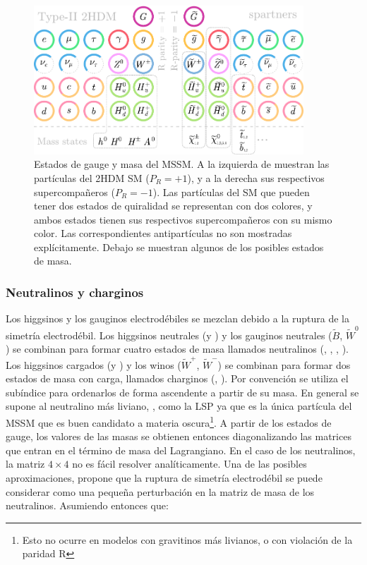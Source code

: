 \begin{figure}
  \centering
  \includegraphics[width=0.9\textwidth]{images/theory/sm_susy_v2.pdf}
  \caption{Estados de gauge y masa del MSSM. A la izquierda de muestran las partículas del 2HDM SM ($P_R = +1$), y a la derecha sus respectivos supercompañeros ($P_R = -1$). Las partículas del SM que pueden tener dos estados de quiralidad se representan con dos colores, y ambos estados tienen sus respectivos supercompañeros con su mismo color. Las correspondientes antipartículas no son mostradas explícitamente. Debajo se muestran algunos de los posibles estados de masa. 
  }
  \label{fig:susy_part}
\end{figure}

\subsubsection{Neutralinos y charginos}

Los higgsinos y los gauginos electrodébiles se mezclan debido a la ruptura de la simetría electrodébil. Los higgsinos neutrales (\Hinouzero y \Hinodzero) y los gauginos neutrales ($\widetilde{B}$, $\widetilde{W}^0$) se combinan para formar cuatro estados de masa llamados neutralinos (\ninoone, \ninotwo, \ninothree, \ninofour). Los higgsinos cargados (\Hinoup y \Hinodm) y los winos ($\widetilde{W}^+$, $\widetilde{W}^-$) se combinan para formar dos estados de masa con carga, llamados charginos (\chinoonepm, \chinotwopm). Por convención se utiliza el subíndice para ordenarlos de forma ascendente a partir de su masa. En general se supone al neutralino más liviano, \ninoone, como la LSP ya que es la única partícula del MSSM que es buen candidato a materia oscura\footnote{Esto no ocurre en modelos con gravitinos más livianos, o con violación de la paridad R}. A partir de los estados de gauge, los valores de las masas se obtienen entonces diagonalizando las matrices que entran en el término de masa del Lagrangiano. En el caso de los neutralinos, la matriz $4\times4$ no es fácil resolver analíticamente. Una de las posibles aproximaciones, propone que la ruptura de simetría electrodébil se puede considerar como una pequeña perturbación en la matriz de masa de los neutralinos. Asumiendo entonces que: 

